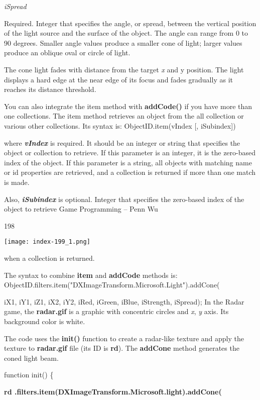 \documentclass[
]{article}
\begin{document}
\emph{iSpread}

Required. Integer that specifies the angle, or spread, between the
vertical position of the light source and the surface of the object. The
angle can range from 0 to 90 degrees. Smaller angle values produce a
smaller cone of light; larger values produce an oblique oval or circle
of light.

The cone light fades with distance from the target \emph{x} and y
position. The light displays a hard edge at the near edge of its focus
and fades gradually as it reaches its distance threshold.

You can also integrate the item method with \textbf{addCode()} if you
have more than one collections. The item method retrieves an object from
the all collection or various other collections. Its syntax is:
ObjectID.item(vIndex {[}, iSubindex{]})

where \emph{\textbf{vIndex}} is required. It should be an integer or
string that specifies the object or collection to retrieve. If this
parameter is an integer, it is the zero-based index of the object. If
this parameter is a string, all objects with matching name or id
properties are retrieved, and a collection is returned if more than one
match is made.

Also, \emph{\textbf{iSubindex}} is optional. Integer that specifies the
zero-based index of the object to retrieve Game Programming -- Penn Wu

198

\protect\hypertarget{index_split_011.htmlux5cux23p199}{}{}\texttt{[image: index-199\_1.png]}

when a collection is returned.

The syntax to combine \textbf{item} and \textbf{addCode} methods is:
ObjectID.filters.item("DXImageTransform.Microsoft.Light").addCone(

iX1, iY1, iZ1, iX2, iY2, iRed, iGreen, iBlue, iStrength, iSpread); In
the Radar game, the \textbf{radar.gif} is a graphic with concentric
circles and \emph{x}, \emph{y} axis. Its background color is white.

The code uses the \textbf{init()} function to create a radar-like
texture and apply the texture to \textbf{radar.gif} file (its ID is
\textbf{rd}). The \textbf{addCone} method generates the coned light
beam.

function init() \{

\textbf{rd
.filters.item(\textquotesingle DXImageTransform.Microsoft.light\textquotesingle).addCone(}
\end{document}
